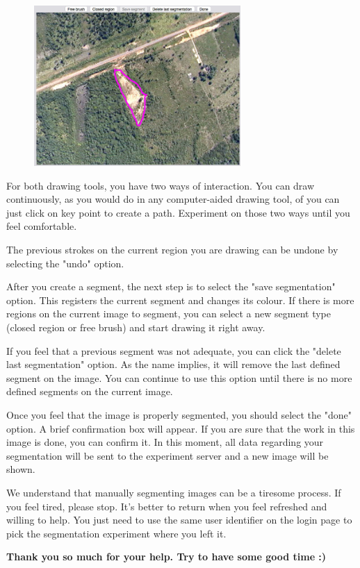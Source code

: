 \begin{figure}[h!]
  \centering
  \includegraphics[width=0.7\textwidth]{imgs/manualseginstr_fig7}
\end{figure}

For both drawing tools, you have two ways of interaction. You can draw continuously, as you would do in any computer-aided drawing tool, of you can just click on key point to create a path. Experiment on those two ways until you feel comfortable.

The previous strokes on the current region you are drawing can be undone by selecting the "undo" option.

After you create a segment, the next step is to select the "save segmentation" option. This registers the current segment and changes its colour. If there is more regions on the current image to segment, you can select a new segment type (closed region or free brush) and start drawing it right away.

If you feel that a previous segment was not adequate, you can click the "delete last segmentation" option. As the name implies, it will remove the last defined segment on the image. You can continue to use this option until there is no more defined segments on the current image.

Once you feel that the image is properly segmented, you should select the "done" option. A brief confirmation box will appear. If you are sure that the work in this image is done, you can confirm it. In this moment, all data regarding your segmentation will be sent to the experiment server and a new image will be shown.

We understand that manually segmenting images can be a tiresome process. If you feel tired, please stop. It's better to return when you feel refreshed and willing to help. You just need to use the same user identifier on the login page to pick the segmentation experiment where you left it.

\textbf{Thank you so much for your help. Try to have some good time :)}